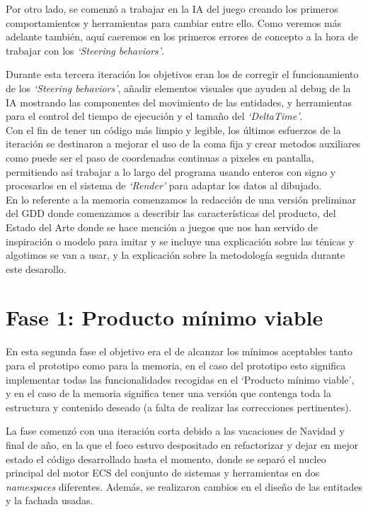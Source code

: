 Por otro lado, se comenzó a trabajar en la \ac{IA} del juego creando los primeros comportamientos
y herramientas para cambiar entre ello. Como veremos más adelante también, aquí caeremos en los primeros
errores de concepto a la hora de trabajar con los \textit{`Steering behaviors'}.

Durante esta tercera iteración los objetivos eran los de corregir el funcionamiento de los
\textit{`Steering behaviors'}, añadir elementos visuales que ayuden al debug de la \ac{IA}
mostrando las componentes del movimiento de las entidades, y herramientas para el control del
tiempo de ejecución y el tamaño del \textit{`DeltaTime'}.\\
Con el fin de tener un código más limpio y legible, los últimos esfuerzos de la iteración se
destinaron a mejorar el uso de la coma fija y crear metodos auxiliares como puede ser el paso de
coordenadas continuas a pixeles en pantalla, permitiendo así trabajar a lo largo del programa 
usando enteros con signo y procesarlos en el sistema de \textit{`Render'} para adaptar los datos
al dibujado.\\
En lo referente a la memoria comenzamos la redacción de una versión preliminar del \ac{GDD}
donde comenzamos a describir las características del producto, del Estado del Arte donde se hace
mención a juegos que nos han servido de inspiración o modelo para imitar y se incluye una explicación
sobre las ténicas y algotimos se van a usar, y la explicación sobre la metodología seguida durante
este desarollo. 

\section{Fase 1: Producto mínimo viable}
En esta segunda fase el objetivo era el de alcanzar los mínimos aceptables tanto para el prototipo
como para la memoria, en el caso del prototipo esto significa implementar todas las funcionalidades
recogidas en el `Producto mínimo viable', y en el caso de la memoria significa tener una versión
que contenga toda la estructura y contenido deseado (a falta de realizar las correcciones
pertinentes).

La fase comenzó con una iteración corta debido a las vacaciones de Navidad y final de año, en la
que el foco estuvo despositado en refactorizar y dejar en mejor estado el código desarrollado
hasta el momento, donde se separó el nucleo principal del motor \ac{ECS} del conjunto de sistemas y
herramientas en dos \textit{namespaces} diferentes. Además, se realizaron cambios en el diseño
de las entitades y la fachada usadas.

